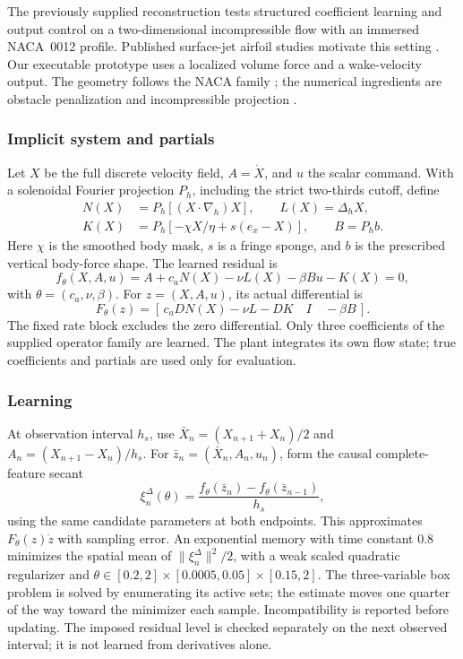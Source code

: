 \documentclass[journal]{IEEEtran}
\begin{document}
The previously supplied reconstruction tests structured coefficient learning and
output control on a two-dimensional
incompressible flow with an immersed NACA~0012 profile. Published surface-jet
airfoil studies motivate this setting \cite{Garcia2025Airfoil,Montala2025Wing}.
Our executable prototype uses a localized volume force and a wake-velocity
output. The geometry follows the NACA family \cite{Jacobs1933NACA}; the
numerical ingredients are obstacle penalization and incompressible projection
\cite{Angot1999Penalization,Chorin1968Projection}.

\subsubsection{Implicit system and partials}
Let $X$ be the full discrete velocity field, $A=\dot X$, and $u$ the scalar
command. With a solenoidal Fourier projection $P_h$, including the strict
two-thirds cutoff, define
\begin{align}
 N(X)&=P_h[(X\cdot\nabla_h)X],\qquad L(X)=\Delta_hX,\nonumber\\
 K(X)&=P_h[-\chi X/\eta+s(e_x-X)],\qquad B=P_hb.
 \label{eq:afc_short_operators}
\end{align}
Here $\chi$ is the smoothed body mask, $s$ is a fringe sponge, and $b$ is
the prescribed vertical body-force shape. The learned residual is
\begin{equation}
 f_\theta(X,A,u)=A+c_aN(X)-\nu L(X)-\beta Bu-K(X)=0,
 \label{eq:afc_short_f}
\end{equation}
with $\theta=(c_a,\nu,\beta)$. For $z=(X,A,u)$, its actual differential is
\begin{equation}
 F_\theta(z)=
 [\,c_aDN(X)-\nu L-DK\quad I\quad-\beta B\,].
 \label{eq:afc_short_F}
\end{equation}
The fixed rate block excludes the zero differential. Only three coefficients
of the supplied operator family are learned. The plant integrates its own
flow state; true coefficients and partials are used only for evaluation.

\subsubsection{Learning}
At observation interval $h_s$, use
$\bar X_n=(X_{n+1}+X_n)/2$ and $A_n=(X_{n+1}-X_n)/h_s$.
For $\bar z_n=(\bar X_n,A_n,u_n)$, form the causal complete-feature secant
\begin{equation}
 \xi_n^\Delta(\theta)=
 \frac{f_\theta(\bar z_n)-f_\theta(\bar z_{n-1})}{h_s},
 \label{eq:afc_short_secant}
\end{equation}
using the same candidate parameters at both endpoints. This approximates
$F_\theta(z)\dot z$ with sampling error. An exponential memory with time
constant $0.8$ minimizes the spatial mean of
$\|\xi_n^\Delta\|^2/2$, with a weak scaled quadratic regularizer and
$\theta\in[0.2,2]\times[0.0005,0.05]\times[0.15,2]$.
The three-variable box problem is solved by enumerating its active sets;
the estimate moves one quarter of the way toward the minimizer each sample.
Incompatibility is reported before updating. The imposed residual level is
checked separately on the next observed interval; it is not learned from
derivatives alone.
\end{document}
